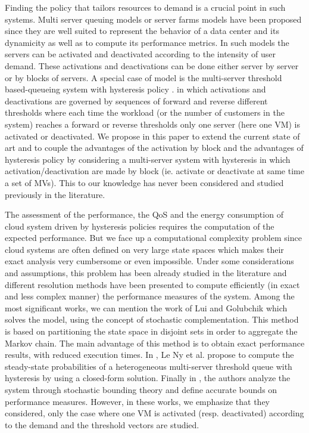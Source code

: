 \documentclass[conference]{IEEEtran}
\begin{document}
Finding the policy that tailors resources to demand is a crucial point in such systems.
Multi server queuing models \cite{Artalejo2005} or server farms models \cite{Gandhi2010,mitrani2013managing} have been proposed 
since they are well suited to represent the behavior of a data center and its dynamicity as well as to compute its performance metrics.
In such models the servers can be activated and deactivated according to the intensity of user demand.
These activations and deactivations can be done either server by server or by blocks of servers.
A special case of model is the multi-server threshold based-queueing system with hysteresis policy \cite{art:serfozo}.
in which activations and deactivations are governed by sequences of forward and reverse different thresholds 
where each time the workload (or the number of customers in the system) reaches a forward or reverse thresholds only one server (here one VM) 
is activated or deactivated. 
We propose in this paper to extend the current state of art and  
to couple the advantages of the activation by block and the advantages of hysteresis policy
by considering a multi-server system with hysteresis in which
activation/deactivation are made by block (ie. activate or deactivate at same time a set of MVs).
This to our knowledge has never been considered and studied previously in the literature. 

The assessment of the performance, the QoS and the energy consumption of cloud system driven by hysteresis policies requires
the computation of the expected performance. But we face up a computational complexity problem since cloud systems are often defined 
on very large state spaces which makes their exact analysis very cumbersome or even impossible.
Under some considerations and assumptions, this problem has been already studied in the literature 
and different resolution methods have been presented to compute efficiently (in exact and less complex manner) the performance measures of the system.
Among the most significant works, we can mention the work of Lui and Golubchik \cite{lui1999stochastic} which  
solves the model, using the concept of stochastic complementation. This method is based on partitioning the state space
in disjoint sets in order to aggregate the Markov chain.  The main advantage of this method is to obtain exact performance results, with reduced
execution times. In \cite{le2000simple}, Le Ny et al. propose to compute the steady-state probabilities of a heterogeneous multi-server threshold queue
with hysteresis by using a closed-form solution.  Finally in \cite{ait2016mascots},   the authors analyze the system through stochastic
bounding theory and define accurate bounds on performance measures.  
However, in these works, we emphasize that they considered, only the case where one VM is activated (resp. deactivated)  according to 
the demand and the threshold vectors are studied. 
\end{document}
